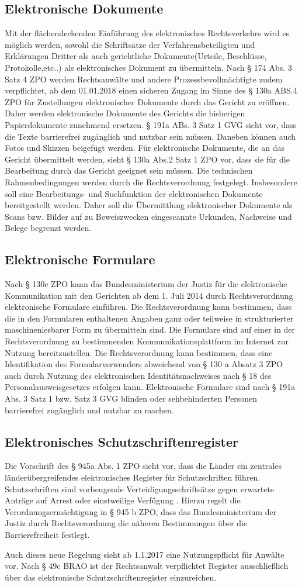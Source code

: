 \subsection*{Elektronische Dokumente}
Mit der flächendeckenden Einführung des elektronisches Rechtsverkehrs wird es möglich werden, sowohl die Schriftsätze der Verfahrensbeteiligten und Erklärungen Dritter als auch gerichtliche Dokumente(Urteile, Beschlüsse, Protokolle,etc..) als elektronisches Dokument zu übermitteln. Nach § 174 Abs. 3 Satz 4 ZPO werden Rechtsanwälte und andere Prozessbevollmächtigte zudem verpflichtet, ab dem 01.01.2018 einen sicheren Zugang im Sinne des § 130a ABS.4 ZPO für Zustellungen elektronischer Dokumente durch das Gericht zu eröffnen. Daher werden elektronische Dokumente des Gerichts die bisherigen Papierdokumente zunehmend ersetzen. § 191a ABs. 3 Satz 1 GVG sieht vor, dass die Texte barrierefrei zugänglich und nutzbar sein müssen. Daneben können auch Fotos und Skizzen beigefügt werden. Für elektronische Dokumente, die an das Gericht übermittelt werden, sieht § 130a Abs.2 Satz 1 ZPO vor, dass sie für die Bearbeitung durch das Gericht geeignet sein müssen. Die technischen Rahmenbedingungen werden durch die Rechtsverordnung festgelegt. Insbesondere soll eine Bearbeitungs- und Suchfunktion der elektronischen Dokumente bereitgestellt werden. Daher soll die Übermittlung elektronischer Dokumente als Scans bzw. Bilder auf zu Beweiszwecken eingescannte Urkunden, Nachweise und Belege begrenzt werden. 
\subsection*{Elektronische Formulare}
Nach § 130c ZPO kann das Bundesministerium der Justiz für die elektronische Kommunikation mit den Gerichten ab dem 1. Juli 2014 durch Rechtsverordnung elektronische Formulare einführen. Die Rechtsverordnung kann bestimmen, dass die in den Formularen enthaltenen Angaben ganz oder teilweise in strukturierter maschinenlesbarer Form zu übermitteln sind. Die Formulare sind auf einer in der Rechtsverordnung zu bestimmenden Kommunikationsplattform im Internet zur Nutzung bereitzustellen.  Die Rechtsverordnung kann bestimmen, dass eine Identifikation des Formularverwenders abweichend von § 130 a Absatz 3 ZPO auch durch Nutzung des elektronischen Identitätsnachweises nach § 18 des Personalausweisgesetzes erfolgen kann. Elektronische Formulare sind nach § 191a Abs. 3 Satz 1 bzw. Satz 3 GVG blinden oder sehbehinderten Personen barrierefrei zugänglich und nutzbar zu machen.
\subsection*{Elektronisches Schutzschriftenregister}
Die Vorschrift des § 945a Abs. 1 ZPO sieht vor, dass die Länder ein zentrales länderübergreifendes elektronisches Register für Schutzschriften führen. Schutzschriften sind vorbeugende Verteidigungsschriftsätze gegen erwartete Anträge auf Arrest oder einstweilige Verfügung . Hierzu regelt die Verordnungsermächtigung in § 945 b ZPO, dass das Bundesministerium der Justiz durch Rechtsverordnung die näheren Bestimmungen über die Barrierefreiheit festlegt.

Auch dieses neue Regelung sieht ab 1.1.2017 eine Nutzungspflicht für Anwälte vor. Nach § 49c BRAO ist der Rechtsanwalt verpflichtet Register ausschließlich über das elektronische Schutzschriftenregister einzureichen.
\newpage